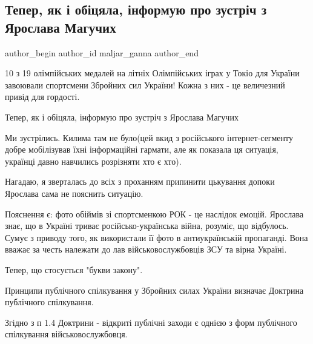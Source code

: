  
 
 
 
 
 
\subsection{Тепер, як і обіцяла, інформую про зустріч з Ярослава Магучих}
\label{sec:13_08_2021.fb.maljar_ganna.1.maguchih_vstrecha}
 
\ifcmt
 author_begin
   author_id maljar_ganna
 author_end
\fi

10 з 19 олімпійських медалей на літніх Олімпійських іграх у Токіо для України
завоювали спортсмени Збройних сил України! Кожна з них - це величезний привід
для гордості.  

Тепер, як і обіцяла, інформую про зустріч з Ярослава Магучих 

Ми зустрілись. Килима там не було(цей вкид з російського інтернет-сегменту
добре мобілізував їхні інформаційні гармати, але як показала ця ситуація,
українці давно навчились розрізняти хто є хто).

Нагадаю, я зверталась до всіх з проханням припинити цькування допоки Ярослава
сама не пояснить ситуацію.

Пояснення є: фото обіймів зі спортсменкою РОК - це наслідок емоцій. Ярослава
знає, що в Україні триває російсько-українська війна, розуміє, що відбулось.
Сумує з приводу того, як використали її фото в антиукраїнській пропаганді. Вона
вважає за честь належати до лав військовослужбовців ЗСУ та вірна Україні. 

Тепер, що стосується "букви закону". 

Принципи публічного спілкування у Збройних силах України визначає Доктрина
публічного спілкування.

Згідно з п 1.4 Доктрини  -  відкриті публічні заходи є однією з форм публічного
спілкування військовослужбовця.

